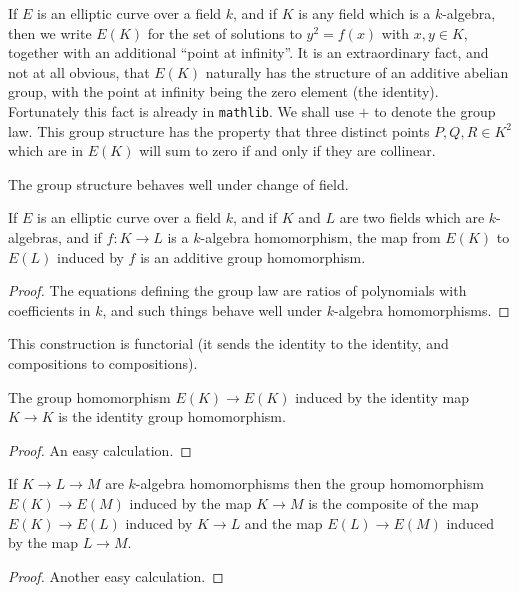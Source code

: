 If $E$ is an elliptic curve over a field $k$, and if $K$ is any field which is a $k$-algebra, then we write $E(K)$ for the set of solutions to $y^2=f(x)$ with $x,y\in K$, together with an additional ``point at infinity''. It is an extraordinary fact, and not at all obvious, that $E(K)$ naturally has the structure of an additive abelian group, with the point at infinity being the zero element (the identity). Fortunately this fact is already in {\tt mathlib}. We shall use $+$ to denote the group law. This group structure has the property that three distinct points $P,Q,R\in K^2$ which are in $E(K)$ will sum to zero if and only if they are collinear.

The group structure behaves well under change of field.

\begin{lemma}\label{EllipticCurve.Points.map}\leanok If $E$ is an elliptic curve over a field $k$, and if $K$ and $L$ are two fields which are $k$-algebras, and if $f:K\to L$ is a $k$-algebra homomorphism, the map from $E(K)$ to $E(L)$ induced by $f$ is an additive group homomorphism. 
\end{lemma}
\begin{proof} The equations defining the group law are ratios of polynomials with coefficients in $k$, and such things behave well under $k$-algebra homomorphisms.
\end{proof}

This construction is functorial (it sends the identity to the identity, and compositions to compositions).

\begin{lemma}\label{EllipticCurve.Points.map_id}
  The group homomorphism $E(K)\to E(K)$ induced by the identity map $K\to K$ is the
  identity group homomorphism.
\end{lemma}
\begin{proof} An easy calculation.
\end{proof}

\begin{lemma}\label{EllipticCurve.Points.map_comp}
  If $K\to L\to M$ are $k$-algebra homomorphisms then the group homomorphism $E(K)\to E(M)$
  induced by the map $K\to M$ is the composite of the map $E(K)\to E(L)$ induced by $K\to L$
  and the map $E(L)\to E(M)$ induced by the map $L\to M$.
\end{lemma}
\begin{proof} Another easy calculation.
\end{proof}

